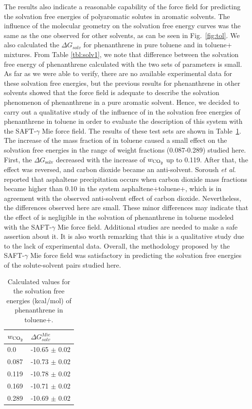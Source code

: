\documentclass[preprint]{elsarticle}
\begin{document}
	The results also indicate a reasonable capability of the force field for predicting the solvation free energies of polyaromatic solutes in aromatic solvents. The influence of the molecular geometry on the solvation free energy curves was the same as the one observed for other solvents, as can be seen in Fig.~\ref{fig:tol}. We also calculated the $\Delta G_{solv}$ for phenanthrene in pure toluene and in toluene+ mixtures. From Table \ref{tbl:solv1}, we note that difference between the solvation free energy of phenanthrene calculated with the two sets of parameters is small. As far as we were able to verify, there are no available experimental data for these solvation free energies, but the previous results for phenanthrene in other solvents showed that the force field is adequate to describe the solvation phenomenon of phenanthrene in a pure aromatic solvent. Hence, we decided to carry out a qualitative study of the influence of  in the solvation free energies of phenanthrene in toluene in order to evaluate the description of this system with the SAFT-$\gamma$ Mie force field. The results of these test sets are shown in Table~\ref{tbl:solvco2}. The increase of the mass fraction of  in toluene caused a small effect on the solvation free energies in the range of weight fractions (0.087-0.289) studied here. First, the $\Delta G_\text{solv}$ decreased with the increase of $w_\text{\ce{CO_2}}$ up to 0.119. After that, the effect was reversed, and carbon dioxide became an anti-solvent. Soroush \textit{et al}. \cite{SOROUSH2014405} reported that asphaltene precipitation occurs when carbon dioxide mass fractions became higher than 0.10 in the system asphaltene+toluene+, which is in agreement with the observed anti-solvent effect of carbon dioxide. Nevertheless, the differences observed here are small. These minor differences may indicate that the effect of  is negligible in the solvation of phenanthrene in toluene modeled with the SAFT-$\gamma$ Mie force field. Additional studies are needed to make a safe assertion about it. It is also worth remarking that this is a qualitative study due to the lack of experimental data. Overall, the methodology proposed by the SAFT-$\gamma$ Mie force field was satisfactory in predicting the solvation free energies of the solute-solvent pairs studied here.
	
	\begin{table}
		\centering
		\caption{Calculated values for the solvation free energies (kcal/mol) of phenanthrene in toluene+.}
		\label{tbl:solvco2}
		\begin{tabular}{ll}
			\hline\hline
			$w_\text{\ce{CO_2}}$ & $\Delta G_{solv}^{Mie}$ \\ \hline
			0.0          & -10.65 $\pm$ 0.02       \\
			0.087        & -10.73 $\pm$ 0.02       \\
			0.119        & -10.78 $\pm$ 0.02       \\
			0.169        & -10.71 $\pm$ 0.02       \\
			0.289        & -10.69 $\pm$ 0.02       \\ \hline\hline
		\end{tabular}
	\end{table}
	
\end{document}
